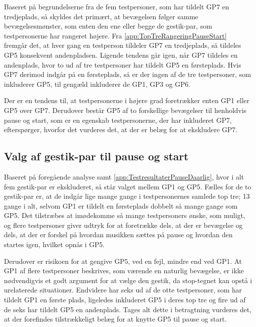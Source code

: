 \noindent
%
Baseret på begrundelserne fra de fem testpersoner, som har tildelt GP7 en tredjeplads, så skyldes det primært, at bevægelsen følger samme bevægelsesmønster, som enten den ene eller begge de gestik-par, som testpersonerne har rangeret højere. Fra \autoref{app:TopTreRangeringPauseStart} fremgår det, at hver gang en testperson tildeler GP7 en tredjeplads, så tildeles GP5 konsekvent andenpladsen. Ligende tendens går igen, når GP7 tildeles en andenplads, hvor to ud af tre testpersoner har tildelt GP5 en førsteplads. Hvis GP7 derimod indgår på en førsteplads, så er der ingen af de tre testpersoner, som inkluderer GP5, til gengæld inkluderer de GP1, GP3 og GP6.

Der er en tendens til, at testpersonerne i højere grad foretrækker enten GP1 eller GP5 over GP7. Derudover består GP5 af to forskellige bevægelser til henholdvis pause og start, som er en egenskab testpersonerne, der har inkluderet GP7, efterspørger, hvorfor det vurderes det, at der er belæg for at ekskludere GP7. 
%
\subsection{Valg af gestik-par til pause og start}
\label{TestresultaterValgAfGestikkerValgPauseStart}
%
Baseret på foregående analyse samt \autoref{app:TestresultaterPauseDaarlig}, hvor i alt fem gestik-par er ekskluderet, så står valget mellem GP1 og GP5. Fælles for de to gestik-par er, at de indgår lige mange gange i testpersonernes samlede top tre; 13 gange i alt, selvom GP1 er tildelt en førsteplads dobbelt så mange gange som GP5. Det tilstræbes at imødekomme så mange testpersoners ønske, som muligt, og flere testpersoner giver udtryk for at foretrække dels, at der er bevægelse og dels, at der er forskel på hvordan musikken sættes på pause og hvordan den startes igen, hvilket opnås i GP5.

Derudover er risikoen for at gengive GP5, ved en fejl, mindre end ved GP1. At GP1 af flere testpersoner beskrives, som værende en naturlig bevægelse, er ikke nødvendigvis et godt argument for at vælge den gestik, da stop-tegnet kan opstå i urelaterede situationer. Endvidere har seks ud af de otte testpersoner, som har tildelt GP1 en første plads, ligeledes inkluderet GP5 i deres top tre og fire ud af de seks har tildelt GP5 en andenplads. Tages alt dette i betragtning vurderes det, at der forefindes tilstrækkeligt belæg for at knytte GP5 til pause og start.

